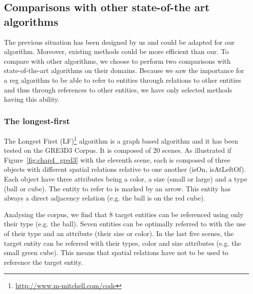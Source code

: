 \subsection{Comparisons with other state-of-the art algorithms}

The previous situation has been designed by us and could be adapted for our algorithm. Moreover, existing methods could be more efficient than our. To compare with other algorithms, we choose to perform two comparisons with state-of-the-art algorithms on their domains. Because we saw the importance for a \acrshort{reg} algorithm to be able to refer to entities through relations to other entities and thus through references to other entities, we have only selected methods having this ability.

\subsubsection{The longest-first}

The Longest First (LF)\footnote{\url{http://www.m-mitchell.com/code}} algorithm \cite{viethen_2013_graphs} is a graph based algorithm and it has been tested on the GRE3D3 Corpus. It is composed of 20 scenes. As illustrated if Figure~\ref{fig:chap4_gred3} with the eleventh scene, each is composed of three objects with different spatial relations relative to one another (isOn, isAtLeftOf). Each object have three attributes being a color, a size (small or large) and a type (ball or cube). The entity to refer to is marked by an arrow. This entity has always a direct adjacency relation (e.g. the ball is on the red cube).

Analysing the corpus, we find that 8 target entities can be referenced using only their type (e.g. the ball). Seven entities can be optimally referred to with the use of their type and an attribute (their size or color). In the last five scenes, the target entity can be referred with their types, color and size attributes (e.g. the small green cube). This means that spatial relations have not to be used to reference the target entity. 

